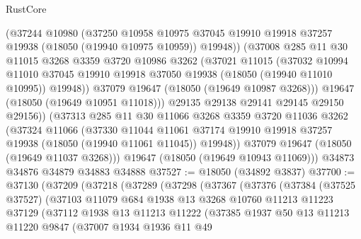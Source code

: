 \begin{lexlean}{RustCore}
\begin{coremodule}
            (@37244
              @10980
              (@37250
                @10958
                @10975
                @37045
                @19910
                @19918
                @37257
                @19938
                (@18050 (@19940 @10975 @10959))
                @19948))
            (@37008
              @285
              @11
              @30
              @11015
              @3268
              @3359
              @3720
              @10986
              @3262
              (@37021
                @11015
                (@37032
                  @10994
                  @11010
                  @37045
                  @19910
                  @19918
                  @37050
                  @19938
                  (@18050 (@19940 @11010 @10995))
                  @19948))
              @37079
              @19647
              (@18050 (@19649 @10987 @3268)))
            @19647
            (@18050 (@19649 @10951 @11018)))
          @29135
          @29138
          @29141
          @29145
          @29150
          @29156))
      (@37313
        @285
        @11
        @30
        @11066
        @3268
        @3359
        @3720
        @11036
        @3262
        (@37324
          @11066
          (@37330
            @11044
            @11061
            @37174
            @19910
            @19918
            @37257
            @19938
            (@18050 (@19940 @11061 @11045))
            @19948))
        @37079
        @19647
        (@18050 (@19649 @11037 @3268)))
      @19647
      (@18050 (@19649 @10943 @11069)))
    @34873
    @34876
    @34879
    @34883
    @34888
@37527 := @18050 (@34892 @3837)
@37700 := @37130
    (@37209
      (@37218
        (@37289
          (@37298
            (@37367
              (@37376
                (@37384
                  (@37525 @37527)
                  (@37103
                    @11079
                    @684
                    @1938
                    @13
                    @3268
                    @10760
                    @11213
                    @11223
                    @37129
                    (@37112
                      @1938
                      @13
                      @11213
                      @11222
                      (@37385
                        @1937
                        @50
                        @13
                        @11213
                        @11220
                        @9847
                        (@37007
                          @1934
                          @1936
                          @11
                          @49

\end{coremodule}
\end{lexlean}
